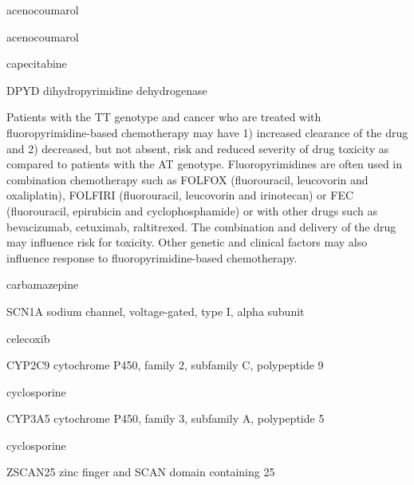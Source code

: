 \documentclass{resume} %
\begin{document}
\begin{rSection}{ acenocoumarol }
\begin{rSection}{ acenocoumarol }
\begin{rSection}{ capecitabine }
\begin{rSubsection}{ DPYD }{ dihydropyrimidine dehydrogenase }{}{}
\item[] Patients with the TT genotype and cancer who are treated with fluoropyrimidine-based chemotherapy may have 1) increased clearance of the drug and 2) decreased, but not absent, risk and reduced severity of drug toxicity as compared to patients with the AT genotype. Fluoropyrimidines are often used in combination chemotherapy such as FOLFOX (fluorouracil, leucovorin and oxaliplatin), FOLFIRI (fluorouracil, leucovorin and irinotecan) or FEC (fluorouracil, epirubicin and cyclophosphamide) or with other drugs such as bevacizumab, cetuximab, raltitrexed. The combination and delivery of the drug may influence risk for toxicity. Other genetic and clinical factors may also influence response to fluoropyrimidine-based chemotherapy.

\end{rSubsection}

\end{rSection}
\begin{rSection}{ carbamazepine }
\item[]
\begin{rSubsection}{ SCN1A }{ sodium channel, voltage-gated, type I, alpha subunit }{}{}
\item[]


\end{rSubsection}

\end{rSection}
\begin{rSection}{ celecoxib }
\item[]
\begin{rSubsection}{ CYP2C9 }{ cytochrome P450, family 2, subfamily C, polypeptide 9 }{}{}
\item[]


\end{rSubsection}

\end{rSection}
\begin{rSection}{ cyclosporine }
\item[]
\begin{rSubsection}{ CYP3A5 }{ cytochrome P450, family 3, subfamily A, polypeptide 5 }{}{}
\item[]


\end{rSubsection}
\begin{rSection}{ cyclosporine }
\item[]
\begin{rSubsection}{ ZSCAN25 }{ zinc finger and SCAN domain containing 25 }{}{}
\item[]



\end{rSubsection}
\end{rSection}
\end{rSection}
\end{rSection}
\end{rSection}
\end{document}
